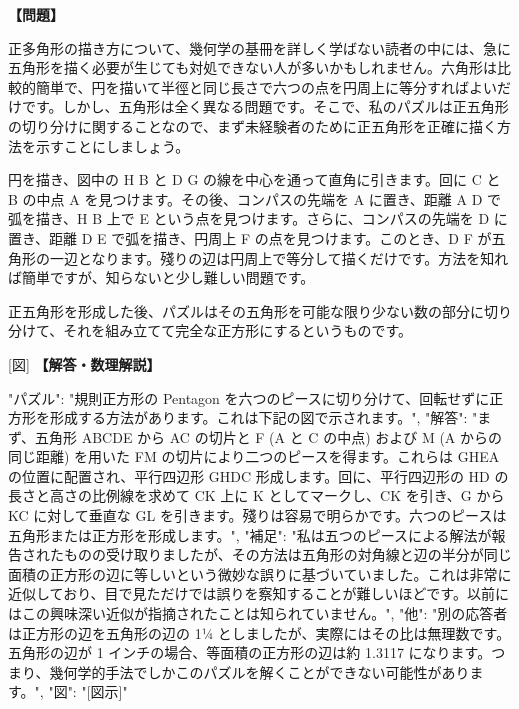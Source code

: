 \documentclass[10pt,a4paper,oneside,openany]{ltjsbook}
\begin{document}
\begin{tcolorbox}[colback=softblue,colframe=primaryblue,title=\textbf{第 155 問：THE PENTAGON AND SQUARE.},arc=2mm,boxrule=1pt,breakable]
\textbf{【問題】}\par\vspace{0.3em}
正多角形の描き方について、幾何学の基冊を詳しく学ばない読者の中には、急に五角形を描く必要が生じても対処できない人が多いかもしれません。六角形は比較的簡単で、円を描いて半徑と同じ長さで六つの点を円周上に等分すればよいだけです。しかし、五角形は全く異なる問題です。そこで、私のパズルは正五角形の切り分けに関することなので、まず未経験者のために正五角形を正確に描く方法を示すことにしましょう。

円を描き、図中の H B と D G の線を中心を通って直角に引きます。回に C と B の中点 A を見つけます。その後、コンパスの先端を A に置き、距離 A D で弧を描き、H B 上で E という点を見つけます。さらに、コンパスの先端を D に置き、距離 D E で弧を描き、円周上 F の点を見つけます。このとき、D F が五角形の一辺となります。殘りの辺は円周上で等分して描くだけです。方法を知れば簡単ですが、知らないと少し難しい問題です。

正五角形を形成した後、パズルはその五角形を可能な限り少ない数の部分に切り分けて、それを組み立てて完全な正方形にするというものです。

[図]
\tcblower
\textbf{【解答・数理解説】}\par\vspace{0.3em}
{
"パズル": "規則正方形の Pentagon を六つのピースに切り分けて、回転せずに正方形を形成する方法があります。これは下記の図で示されます。",
"解答": "まず、五角形 ABCDE から AC の切片と F (A と C の中点) および M (A からの同じ距離) を用いた FM の切片により二つのピースを得ます。これらは GHEA の位置に配置され、平行四辺形 GHDC 形成します。回に、平行四辺形の HD の長さと高さの比例線を求めて CK 上に K としてマークし、CK を引き、G から KC に対して垂直な GL を引きます。殘りは容易で明らかです。六つのピースは五角形または正方形を形成します。",
"補足": "私は五つのピースによる解法が報告されたものの受け取りましたが、その方法は五角形の対角線と辺の半分が同じ面積の正方形の辺に等しいという微妙な誤りに基づいていました。これは非常に近似しており、目で見ただけでは誤りを察知することが難しいほどです。以前にはこの興味深い近似が指摘されたことは知られていません。",
"他": "別の応答者は正方形の辺を五角形の辺の 1¼ としましたが、実際にはその比は無理数です。五角形の辺が 1 インチの場合、等面積の正方形の辺は約 1.3117 になります。つまり、幾何学的手法でしかこのパズルを解くことができない可能性があります。",
"図": "[図示]"
}
\end{tcolorbox}
\end{document}

